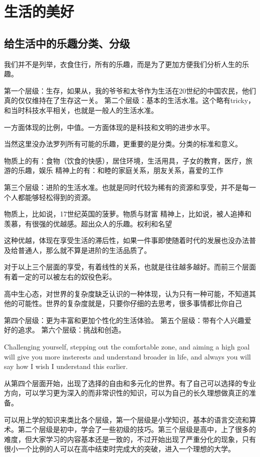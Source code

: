 \section{生活的美好}

\subsection{给生活中的乐趣分类、分级}
我们并不是列举，衣食住行，所有的乐趣，而是为了更加方便我们分析人生的乐趣。

第一个层级：生存，如果从，我的爷爷和太爷作为生活在20世纪的中国农民，他们真的仅仅维持在了生存这一关。
第二个层级：基本的生活水准。这个略有tricky，和当时科技水平相关，也就是一般人的生活水准。

一方面体现的比例，中值。一方面体现的是科技和文明的进步水平。

当然这里没办法罗列所有可能的乐趣，更重要的是分类。分类的标准和意义。

物质上的有：食物（饮食的快感），居住环境，生活用具，子女的教育，医疗，旅游的乐趣，娱乐
精神上的有：和睦的家庭关系，朋友关系，喜爱的工作

第三个层级：进阶的生活水准。也就是同时代较为稀有的资源和享受，并不是每一个人都能够轻松得到的资源。

物质上，比如说，17世纪英国的菠萝。物质与财富
精神上，比如说，被人追捧和羡慕，有很强的优越感。超出众人的乐趣。权利和名望

这种优越，体现在享受生活的滞后性，如果一件事即使随着时代的发展也没办法普及给普通人，那么就不算是进阶的生活品质了。

对于以上三个层面的享受，有着线性的关系，也就是往往越多越好。而前三个层面有着一定的可以被左右的奴役色彩。

高中生心态，对世界的复杂度缺乏认识的一种体现，认为只有一种可能，不知道其他的可能性。世界的复杂度就是，只要你仔细的去思考，很多事情都比你自己

第四个层级：更为丰富和更加个性化的生活体验。
第五个层级：带有个人兴趣爱好的追求。
第六个层级：挑战和创造。

Challenging yourself, stepping out the comfortable zone, and aiming a high goal will give you more insterests and understand broader in life, and always you will say how I wish I understand this earlier.

从第四个层面开始，出现了选择的自由和多元化的世界。有了自己可以选择的专业方向，可以学习更为深入的而非常识性的知识，可以为自己的长久理想做真正的准备。

可以用上学的知识来类比各个层级，第一个层级是小学知识，基本的语言交流和算术。第二个层级是初中，学会了一些初级的技巧。第三个层级是高中，上了很多的难度，但大家学习的内容基本还是一致的，不过开始出现了严重分化的现象，只有很小一个比例的人可以在高中结束时完成大的突破，进入一个理想的大学。

